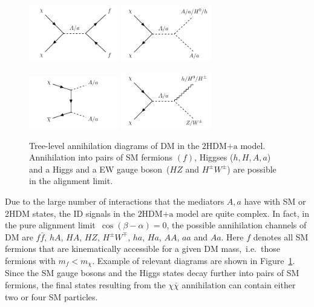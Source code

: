 \documentclass[a4paper, 11pt,notoc]{article}
\newcommand{\hdma}{\ensuremath{\textrm{2HDM+a}}\xspace}
\begin{document}
\begin{figure}[t!]
\centering
\includegraphics[width=0.35\textwidth]{graph_2hdm_relic_s_fermions.pdf} \qquad 
\includegraphics[width=0.35\textwidth]{graph_2hdm_relic_s_bosons.pdf} 

\vspace{5mm}

\includegraphics[width=0.35\textwidth]{graph_2hdm_relic_ss_bosons.pdf} \qquad 
\includegraphics[width=0.35\textwidth]{graph_2hdm_relic_s_vbosons.pdf}
\vspace{4mm}
\caption{Tree-level annihilation diagrams of DM in the \hdma model. {\color{green}  Annihilation} into pairs of SM fermions $(f)$, Higgses ($h, H,A,a$) and a Higgs and a EW gauge boson~($HZ$ and $H^\pm W^\pm$) are possible in the alignment limit.}
\label{fig:feyn_annihilation}
\end{figure}

Due to the large number of interactions that the mediators $A, a$ have with SM or 2HDM states, the ID signals in the \hdma model are quite complex. In fact, in the pure alignment limit~$\cos (\beta - \alpha) = 0$, the possible {\color{green} annihilation} channels of DM are $ f \bar f$, $hA$, $HA$, $HZ$,  $H^\pm W^\mp$, $ha$, $Ha$, $AA$, $aa$ and $Aa$.  Here $f$ denotes all SM fermions that are kinematically accessible for a given DM mass,~i.e.~those fermions with $m_f < m_\chi$. Example of relevant diagrams are shown in Figure~\ref{fig:feyn_annihilation}. Since the SM gauge bosons and the Higgs states decay further into pairs of SM fermions, the final states resulting from the $\chi \bar \chi$ annihilation can contain either two or four SM particles. 
\end{document}
